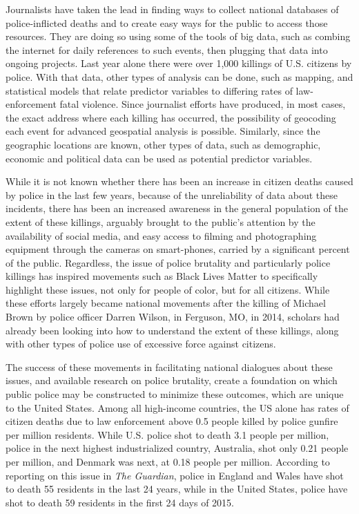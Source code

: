 \documentclass[sigconf]{acmart}
\begin{document}
Journalists have taken the lead in finding ways to collect national databases of police-inflicted deaths and to create easy ways for the public to access those resources. \cite{currie16,nix17,counted,fatalforce} They are doing so using some of the tools of big data, such as combing the internet for daily references to such events, then plugging that data into ongoing projects.  Last year alone there were over 1,000 killings of U.S. citizens by police. \cite{counted}  With that data, other types of analysis can be done, such as mapping, and statistical models that relate predictor variables to differing rates of law-enforcement fatal violence.  Since journalist efforts have produced, in most cases, the exact address where each killing has occurred, the possibility of geocoding each event for advanced geospatial analysis is possible. \cite{dalton17}  Similarly, since the geographic locations are known, other types of data, such as demographic, economic and political data can be used as potential predictor variables. \cite{smith04,legewie15}

While it is not known whether there has been an increase in citizen deaths caused by police in the last few  years, because of the unreliability of data about these incidents, there has been an increased awareness in the general population of the extent of these killings, arguably brought to the public's attention by the availability of social media, and easy access to filming and photographing equipment through the cameras on smart-phones, carried by a significant percent of the public. \cite{bonilla15,brucato15,nix17}  Regardless, the issue of police brutality and particularly police killings has inspired movements such as Black Lives Matter to specifically highlight these issues, not only for people of color, but for all citizens.  While these efforts largely became national movements after the killing of Michael Brown by police officer Darren Wilson, in Ferguson, MO, in 2014, scholars had already been looking into how to understand the extent of these killings, along with other types of police use of excessive force against citizens. \cite{smith04,smith14,meeks06,schneider14,chaney13,holmes00}  

The success of these movements in facilitating national dialogues about these issues, and available research on police brutality, create a foundation on which public police may be constructed to minimize these outcomes, which are unique to the United States. Among all high-income countries, the US alone has rates of citizen deaths due to law enforcement above 0.5 people killed by police gunfire per million residents.  While U.S. police shot to death 3.1 people per million, police in the next highest industrialized country, Australia, shot only 0.21 people per million, and Denmark was next, at 0.18 people per million. \cite{ser16}  According to reporting on this issue in {\em The Guardian}, police in England and Wales have shot to death 55 residents in the last 24 years, while in the United States, police have shot to death 59 residents in the first 24 days of 2015. \cite{lartey15} 
\end{document}
